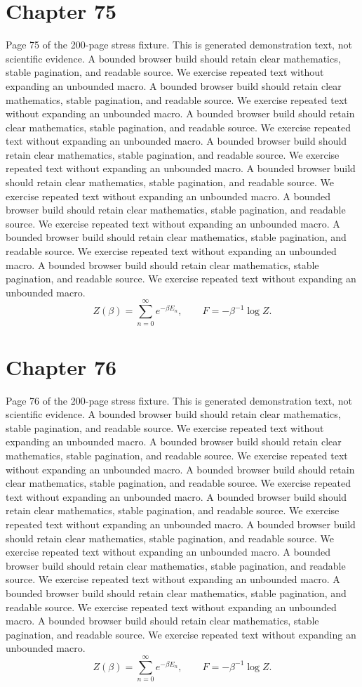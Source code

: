 \documentclass[11pt]{article}
\begin{document}
\section*{Chapter 75}
Page 75 of the 200-page stress fixture. This is generated demonstration text, not scientific evidence.
A bounded browser build should retain clear mathematics, stable pagination, and readable source. We exercise repeated text without expanding an unbounded macro.
A bounded browser build should retain clear mathematics, stable pagination, and readable source. We exercise repeated text without expanding an unbounded macro.
A bounded browser build should retain clear mathematics, stable pagination, and readable source. We exercise repeated text without expanding an unbounded macro.
A bounded browser build should retain clear mathematics, stable pagination, and readable source. We exercise repeated text without expanding an unbounded macro.
A bounded browser build should retain clear mathematics, stable pagination, and readable source. We exercise repeated text without expanding an unbounded macro.
A bounded browser build should retain clear mathematics, stable pagination, and readable source. We exercise repeated text without expanding an unbounded macro.
A bounded browser build should retain clear mathematics, stable pagination, and readable source. We exercise repeated text without expanding an unbounded macro.
A bounded browser build should retain clear mathematics, stable pagination, and readable source. We exercise repeated text without expanding an unbounded macro.
\[Z(\beta)=\sum_{n=0}^{\infty}e^{-\beta E_n},\qquad F=-\beta^{-1}\log Z.\]
\newpage
\section*{Chapter 76}
Page 76 of the 200-page stress fixture. This is generated demonstration text, not scientific evidence.
A bounded browser build should retain clear mathematics, stable pagination, and readable source. We exercise repeated text without expanding an unbounded macro.
A bounded browser build should retain clear mathematics, stable pagination, and readable source. We exercise repeated text without expanding an unbounded macro.
A bounded browser build should retain clear mathematics, stable pagination, and readable source. We exercise repeated text without expanding an unbounded macro.
A bounded browser build should retain clear mathematics, stable pagination, and readable source. We exercise repeated text without expanding an unbounded macro.
A bounded browser build should retain clear mathematics, stable pagination, and readable source. We exercise repeated text without expanding an unbounded macro.
A bounded browser build should retain clear mathematics, stable pagination, and readable source. We exercise repeated text without expanding an unbounded macro.
A bounded browser build should retain clear mathematics, stable pagination, and readable source. We exercise repeated text without expanding an unbounded macro.
A bounded browser build should retain clear mathematics, stable pagination, and readable source. We exercise repeated text without expanding an unbounded macro.
\[Z(\beta)=\sum_{n=0}^{\infty}e^{-\beta E_n},\qquad F=-\beta^{-1}\log Z.\]
\newpage
\end{document}

